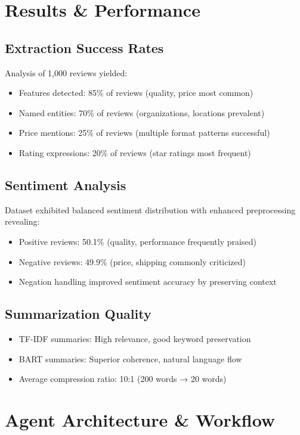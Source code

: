 \documentclass[11pt,a4paper]{article}
\begin{document}
\section{Results \& Performance}

\subsection{Extraction Success Rates}
Analysis of 1,000 reviews yielded:
\begin{itemize}[itemsep=0pt]
    \item Features detected: 85\% of reviews (quality, price most common)
    \item Named entities: 70\% of reviews (organizations, locations prevalent)
    \item Price mentions: 25\% of reviews (multiple format patterns successful)
    \item Rating expressions: 20\% of reviews (star ratings most frequent)
\end{itemize}

\subsection{Sentiment Analysis}
Dataset exhibited balanced sentiment distribution with enhanced preprocessing revealing:
\begin{itemize}[itemsep=0pt]
    \item Positive reviews: 50.1\% (quality, performance frequently praised)
    \item Negative reviews: 49.9\% (price, shipping commonly criticized)
    \item Negation handling improved sentiment accuracy by preserving context
\end{itemize}

\subsection{Summarization Quality}
\begin{itemize}[itemsep=0pt]
    \item TF-IDF summaries: High relevance, good keyword preservation
    \item BART summaries: Superior coherence, natural language flow
    \item Average compression ratio: 10:1 (200 words → 20 words)
\end{itemize}

\section{Agent Architecture \& Workflow}
\end{document}
